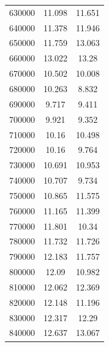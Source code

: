 \documentclass{article}
\begin{document}
\begin{longtable}{c|c|c}
           630000 &                     11.098 &                     11.651 \\
           640000 &                     11.378 &                     11.946 \\
           650000 &                     11.759 &                     13.063 \\
           660000 &                     13.022 &                     13.28  \\
           670000 &                     10.502 &                     10.008 \\
           680000 &                     10.263 &                      8.832 \\
           690000 &                      9.717 &                      9.411 \\
           700000 &                      9.921 &                      9.352 \\
           710000 &                     10.16  &                     10.498 \\
           720000 &                     10.16  &                      9.764 \\
           730000 &                     10.691 &                     10.953 \\
           740000 &                     10.707 &                      9.734 \\
           750000 &                     10.865 &                     11.575 \\
           760000 &                     11.165 &                     11.399 \\
           770000 &                     11.801 &                     10.34  \\
           780000 &                     11.732 &                     11.726 \\
           790000 &                     12.183 &                     11.757 \\
           800000 &                     12.09  &                     10.982 \\
           810000 &                     12.062 &                     12.369 \\
           820000 &                     12.148 &                     11.196 \\
           830000 &                     12.317 &                     12.29  \\
           840000 &                     12.637 &                     13.067 \\

\end{longtable}
\end{document}
